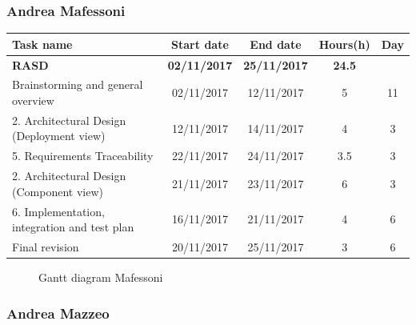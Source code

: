 
\subsubsection{Andrea Mafessoni}

\begin{table}[h!]
	\begin{tabular}{lcccc}
		\toprule
		\textbf{Task name} & \textbf{Start date} & \textbf{End date} & \textbf{Hours(h)} & \textbf{Day} \\
		\midrule
		\textbf{RASD} & \textbf{02/11/2017} & \textbf{25/11/2017} & \textbf{24.5} & \\
		Brainstorming and general overview & 02/11/2017 & 12/11/2017 & 5 & 11 \\
		2. Architectural Design (Deployment view) & 12/11/2017 & 14/11/2017 & 4 & 3 \\
		5. Requirements Traceability & 22/11/2017 & 24/11/2017 & 3.5 & 3 \\
		2. Architectural Design (Component view) & 21/11/2017 & 23/11/2017 & 6 & 3 \\
		6. Implementation, integration and test plan & 16/11/2017 & 21/11/2017 & 4 & 6 \\
		\bottomrule
		Final revision & 20/11/2017 & 25/11/2017 & 3 & 6 \\
	\end{tabular}
\end{table}

\begin{figure}[!h]
	\centering
	\caption{Gantt diagram Mafessoni}
\end{figure}
\clearpage

\subsubsection{Andrea Mazzeo}

